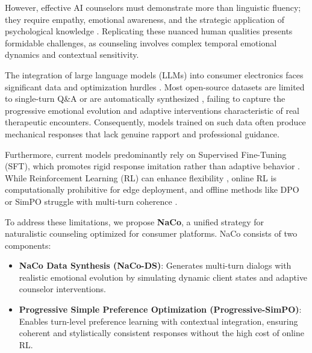 \documentclass[lettersize,journal]{IEEEtran}
\begin{document}
However, effective AI counselors must demonstrate more than linguistic fluency; they require empathy, emotional awareness, and the strategic application of psychological knowledge \cite{Yang2024, Liu2023, Na2024}. Replicating these nuanced human qualities presents formidable challenges, as counseling involves complex temporal emotional dynamics and contextual sensitivity. 

The integration of large language models (LLMs) into consumer electronics faces significant data and optimization hurdles \cite{TCE_Wearable2024, TCE_MentalHealth2024}. Most open-source datasets are limited to single-turn Q\&A or are automatically synthesized \cite{Zhang2024a, Chen2023, Qiu2024}, failing to capture the progressive emotional evolution and adaptive interventions characteristic of real therapeutic encounters. Consequently, models trained on such data often produce mechanical responses that lack genuine rapport and professional guidance.



Furthermore, current models predominantly rely on Supervised Fine-Tuning (SFT), which promotes rigid response imitation rather than adaptive behavior \cite{Dong2024}. While Reinforcement Learning (RL) can enhance flexibility \cite{Ouyang2022}, online RL is computationally prohibitive for edge deployment, and offline methods like DPO \cite{Rafailov2023} or SimPO \cite{Meng2024} struggle with multi-turn coherence \cite{Chu2025, Singh2002}.

To address these limitations, we propose \textbf{NaCo}, a unified strategy for naturalistic counseling optimized for consumer platforms. NaCo consists of two components:
\begin{itemize}
    \item \textbf{NaCo Data Synthesis (NaCo-DS)}: Generates multi-turn dialogs with realistic emotional evolution by simulating dynamic client states and adaptive counselor interventions.
    \item \textbf{Progressive Simple Preference Optimization (Progressive-SimPO)}: Enables turn-level preference learning with contextual integration, ensuring coherent and stylistically consistent responses without the high cost of online RL.
\end{itemize}
\end{document}
